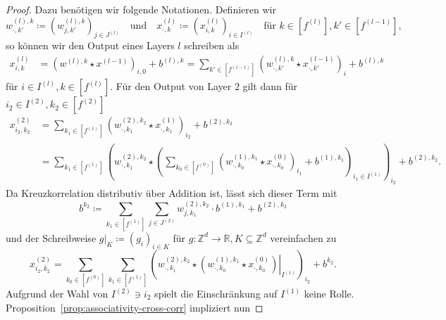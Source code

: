 \documentclass[paper=a4, 	%
		fontsize=11pt,
		abstract=true, 	%
		headsepline, 	%
		notitlepage	%
		]{scrartcl}
\theoremstyle{definition}
\newcommand{\R}{\mathbb{R}}
\newcommand{\Z}{\mathbb{Z}}
\newcommand{\fNat}[1]{[ #1 ]}
\begin{document}
\begin{proof}
    \newcommand{\bcdot}{\boldsymbol{\cdot}}
    Dazu benötigen wir folgende Notationen.
    Definieren wir \[
        w^{(l), k}_{\bcdot, k'}\coloneqq \left( w_{j,k'}^{(l),k}\right)_{j\in J^{(l)}}
        \quad \text{und} \quad
        x^{(l)}_{\bcdot, k} \coloneqq \left( x^{(l)}_{i,k} \right)_{i\in I^{(l)}}
        \quad \text{für $k\in \fNat{f^{(l)}}, k'\in\fNat{f^{(l-1)}}$},
    \]
    so können wir den Output eines Layers $l$ schreiben als 
    \begin{align*}
        x^{(l)}_{i, k}
        &=  \left( w^{(l),k} \star x^{(l-1)}\right)_{i,0} + b^{(l),k}
        = \sum_{k'\in \fNat{f^{(l-1)}}}  \left(w^{(l),k}_{\bcdot,k'} \star x^{(l-1)}_{\bcdot,k'} \right)_i + b^{(l),k}
    \end{align*}
    für $i\in I^{(l)}, k\in\fNat{f^{(l)}}$.
    Für den Output von Layer $2$ gilt dann für $i_2\in I^{(2)}, k_2\in \fNat{f^{(2)}}$
    \begin{align*}
        x^{(2)}_{i_2,k_2}
        &= \sum_{k_1\in \fNat{f^{(1)}}}  \left(w^{(2),k_2}_{\bcdot,k_1} \star x^{(1)}_{\bcdot,k_1} \right)_{i_2} + b^{(2),k_2} \\
        &= \sum_{k_1\in \fNat{f^{(1)}}}  \left(w^{(2),k_2}_{\bcdot,k_1} \star \left( 
%
            \sum_{k_0\in \fNat{f^{(0)}}}  \left(w^{(1),k_1}_{\bcdot,k_0} \star x^{(0)}_{\bcdot,k_0} \right)_{i_1} + b^{(1),k_1}
%
         \right)_{i_1\in I^{(1)}} \right)_{i_2} + b^{(2),k_2}.
    \end{align*}
    Da Kreuzkorrelation distributiv über Addition ist, lässt sich dieser Term mit \[
        b^{k_2}\coloneqq \sum_{k_1\in\fNat{f^{(1)}}}\sum_{j\in J^{(2)}} w^{(2), k_2}_{j,k_1} \cdot b^{(1),k_1} + b^{(2), k_2}
    \]
    \newcommand{\rest}[2]{\left.{#1}\right|_{#2}}
    und der Schreibweise $\rest{g}{K} \coloneqq (g_i)_{i\in K}$ für $g: \Z^d \rightarrow \R, K\subseteq \Z^d$ vereinfachen zu 
    \[
        x^{(2)}_{i_2,k_2} 
        = \sum_{k_0\in \fNat{f^{(0)}}}\sum_{k_1\in \fNat{f^{(1)}}}  \left(w^{(2),k_2}_{\bcdot,k_1} \star 
        \rest{\left(w^{(1),k_1}_{\bcdot,k_0} \star x^{(0)}_{\bcdot,k_0} \right)}{I^{(1)}}
        \right)_{i_2} + b^{k_2}.
    \]
    Aufgrund der Wahl von $I^{(2)}\ni i_2$ spielt die Einschränkung auf $I^{(1)}$ keine Rolle.
    Proposition~\ref{prop:associativity-cross-corr} impliziert nun

\end{proof}
\end{document}
